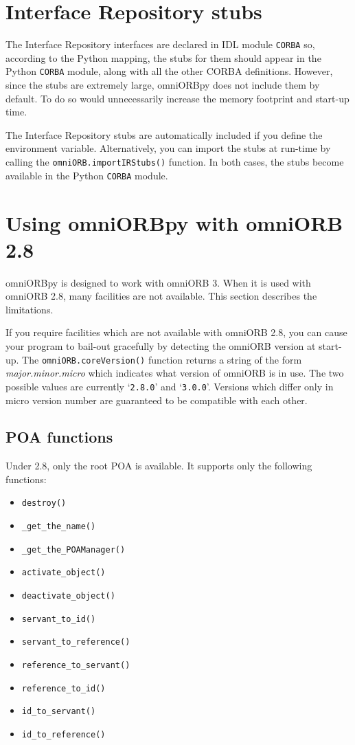 \documentclass[11pt,twoside,a4paper]{book}
\newcommand{\module}[1]{\texttt{#1}}
\newcommand{\op}[1]{\texttt{#1()}}
\newenvironment{nsitemize}%
 {\begin{itemize}\setlength{\itemsep}{0pt}}%
 {\end{itemize}}
\newcommand{\envvar}{\begingroup \urlstyle{tt}\Url}
\begin{document}
\section{Interface Repository stubs}
\label{sec:ifrstubs}

The Interface Repository interfaces are declared in IDL module
\module{CORBA} so, according to the Python mapping, the stubs for them
should appear in the Python \module{CORBA} module, along with all the
other CORBA definitions. However, since the stubs are extremely large,
omniORBpy does not include them by default. To do so would
unnecessarily increase the memory footprint and start-up time.

The Interface Repository stubs are automatically included if you
define the \envvar{OMNIORBPY_IMPORT_IR_STUBS} environment variable.
Alternatively, you can import the stubs at run-time by calling the
\op{omniORB.importIRStubs} function. In both cases, the stubs become
available in the Python \module{CORBA} module.




\section{Using omniORBpy with omniORB 2.8}

omniORBpy is designed to work with omniORB 3. When it is used with
omniORB 2.8, many facilities are not available. This section describes
the limitations.

If you require facilities which are not available with omniORB 2.8,
you can cause your program to bail-out gracefully by detecting the
omniORB version at start-up. The \op{omniORB.coreVersion} function
returns a string of the form \textit{major.minor.micro} which
indicates what version of omniORB is in use. The two possible values
are currently `\texttt{2.8.0}' and `\texttt{3.0.0}'. Versions which
differ only in micro version number are guaranteed to be compatible
with each other.

\subsection{POA functions}

Under 2.8, only the root POA is available. It supports only the
following functions:

\begin{nsitemize}
\item \op{destroy}
\item \op{\_get\_the\_name}
\item \op{\_get\_the\_POAManager}
\item \op{activate\_object}
\item \op{deactivate\_object}
\item \op{servant\_to\_id}
\item \op{servant\_to\_reference}
\item \op{reference\_to\_servant}
\item \op{reference\_to\_id}
\item \op{id\_to\_servant}
\item \op{id\_to\_reference}
\end{nsitemize}
\end{document}
